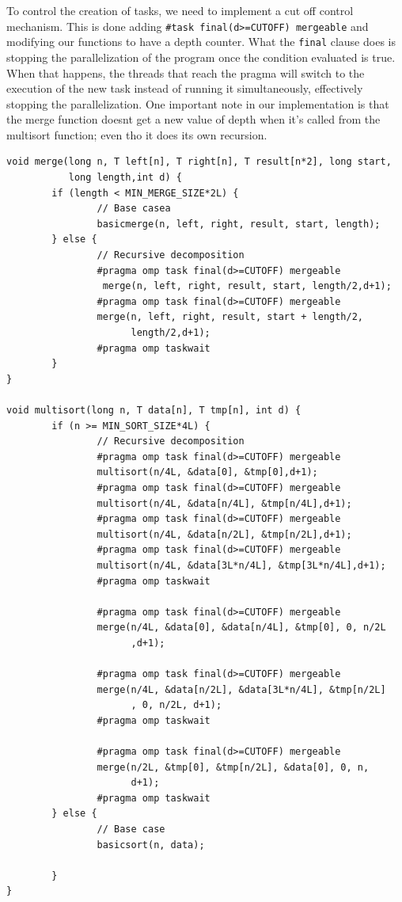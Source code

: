 \documentclass{article}
\begin{document}
\justify
To control the creation of tasks, we need to implement a cut off control mechanism. This is done adding \texttt{\#task final(d>=CUTOFF) mergeable} and modifying our functions to have a depth counter. What the \texttt{final} clause does is stopping the parallelization of the program once the condition evaluated is true. When that happens, the threads that reach the pragma will switch to the execution of the new task instead of running it simultaneously, effectively stopping the parallelization.
One important note in our implementation is that the merge function doesnt get a new value of depth when it's called from the multisort function; even tho it does its own recursion.
\newline
\begin{lstlisting}
void merge(long n, T left[n], T right[n], T result[n*2], long start,
           long length,int d) {
        if (length < MIN_MERGE_SIZE*2L) {
                // Base casea
                basicmerge(n, left, right, result, start, length);
        } else {
                // Recursive decomposition
                #pragma omp task final(d>=CUTOFF) mergeable
                 merge(n, left, right, result, start, length/2,d+1);
                #pragma omp task final(d>=CUTOFF) mergeable
                merge(n, left, right, result, start + length/2,
                      length/2,d+1);
                #pragma omp taskwait
        }
}

void multisort(long n, T data[n], T tmp[n], int d) {
        if (n >= MIN_SORT_SIZE*4L) {
                // Recursive decomposition
                #pragma omp task final(d>=CUTOFF) mergeable
                multisort(n/4L, &data[0], &tmp[0],d+1);
                #pragma omp task final(d>=CUTOFF) mergeable
                multisort(n/4L, &data[n/4L], &tmp[n/4L],d+1);
                #pragma omp task final(d>=CUTOFF) mergeable
                multisort(n/4L, &data[n/2L], &tmp[n/2L],d+1);
                #pragma omp task final(d>=CUTOFF) mergeable
                multisort(n/4L, &data[3L*n/4L], &tmp[3L*n/4L],d+1);
                #pragma omp taskwait

                #pragma omp task final(d>=CUTOFF) mergeable
                merge(n/4L, &data[0], &data[n/4L], &tmp[0], 0, n/2L
                      ,d+1);

                #pragma omp task final(d>=CUTOFF) mergeable
                merge(n/4L, &data[n/2L], &data[3L*n/4L], &tmp[n/2L]
                      , 0, n/2L, d+1);
                #pragma omp taskwait

                #pragma omp task final(d>=CUTOFF) mergeable
                merge(n/2L, &tmp[0], &tmp[n/2L], &data[0], 0, n,
                      d+1);
                #pragma omp taskwait
        } else {
                // Base case
                basicsort(n, data);

        }
}
\end{lstlisting}
\end{document}
